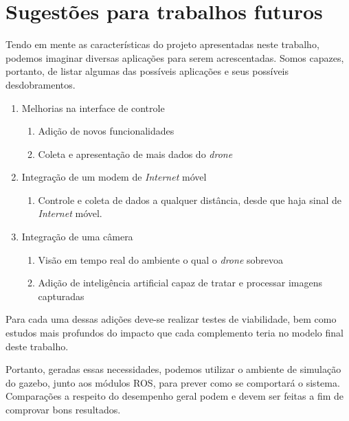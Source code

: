 \documentclass[12pt,a4paper,oneside]{book}
\begin{document}
\chapter{Sugestões para trabalhos futuros}
%
\thispagestyle{empty} 
%
%
Tendo em mente as características do projeto apresentadas neste trabalho, podemos imaginar diversas aplicações para serem acrescentadas. Somos capazes, portanto, de listar algumas das possíveis aplicações e seus possíveis desdobramentos.
%
\begin{enumerate}
    \item Melhorias na interface de controle 
        \begin{enumerate}
            \item Adição de novos funcionalidades
            \item Coleta e apresentação de mais dados do \textit{drone}  
        \end{enumerate}
    \item Integração de um modem de \textit{Internet} móvel
        \begin{enumerate}
            \item Controle e coleta de dados a qualquer distância, desde que haja sinal de \textit{Internet} móvel.
        \end{enumerate}
    \item Integração de uma câmera
        \begin{enumerate}
            \item Visão em tempo real do ambiente o qual o \textit{drone} sobrevoa
            \item Adição de inteligência artificial capaz de tratar e processar imagens capturadas
        \end{enumerate}
\end{enumerate}

Para cada uma dessas adições deve-se realizar testes de viabilidade, bem como estudos mais profundos do impacto que cada complemento teria no modelo final deste trabalho. 

Portanto, geradas essas necessidades, podemos utilizar o ambiente de simulação do gazebo, junto aos módulos ROS, para prever como se comportará o sistema. Comparações a respeito do desempenho geral podem e devem ser feitas a fim de comprovar bons resultados.



\end{document}
